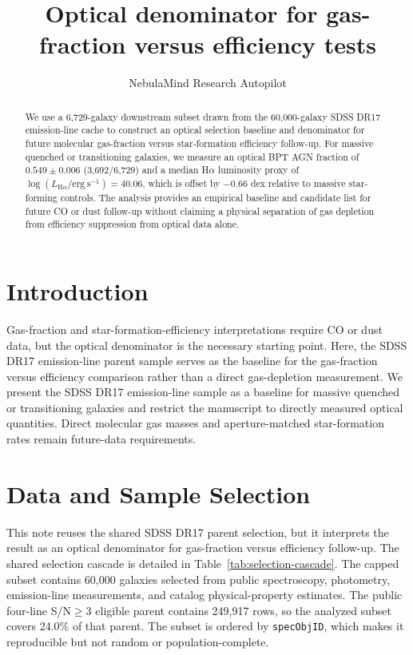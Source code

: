 \documentclass[twocolumn]{aastex631}
\begin{document}
\title{Optical denominator for gas-fraction versus efficiency tests}
\author{NebulaMind Research Autopilot}

\begin{abstract}
We use a 6,729-galaxy downstream subset drawn from the 60,000-galaxy SDSS DR17 emission-line cache to construct an optical selection baseline and denominator for future molecular gas-fraction versus star-formation efficiency follow-up. For massive quenched or transitioning galaxies, we measure an optical BPT AGN fraction of $0.549 \pm 0.006$ (3,692/6,729) and a median H$\alpha$ luminosity proxy of $\log(L_{\mathrm{H}\alpha} / \mathrm{erg~s}^{-1}) = 40.06$, which is offset by $-0.66$ dex relative to massive star-forming controls. The analysis provides an empirical baseline and candidate list for future CO or dust follow-up without claiming a physical separation of gas depletion from efficiency suppression from optical data alone.
\end{abstract}


\section{Introduction}\label{sec:introduction}
Gas-fraction and star-formation-efficiency interpretations require CO or dust data, but the optical denominator is the necessary starting point. Here, the SDSS DR17 emission-line parent sample serves as the baseline for the gas-fraction versus efficiency comparison rather than a direct gas-depletion measurement. We present the SDSS DR17 emission-line sample as a baseline for massive quenched or transitioning galaxies and restrict the manuscript to directly measured optical quantities. Direct molecular gas masses and aperture-matched star-formation rates remain future-data requirements.


\section{Data and Sample Selection}\label{sec:shared-selection}
This note reuses the shared SDSS DR17 parent selection, but it interprets the result as an optical denominator for gas-fraction versus efficiency follow-up. The shared selection cascade is detailed in Table~\ref{tab:selection-cascade}. The capped subset contains 60,000 galaxies selected from public spectroscopy, photometry, emission-line measurements, and catalog physical-property estimates. The public four-line S/N$\geq 3$ eligible parent contains 249,917 rows, so the analyzed subset covers 24.0\% of that parent. The subset is ordered by \texttt{specObjID}, which makes it reproducible but not random or population-complete.
\end{document}
